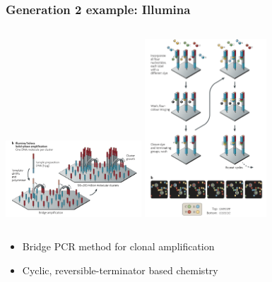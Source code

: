 \documentclass[serif,11pt]{beamer}
\begin{document}
\begin{frame}
\frametitle{Generation 2 example: Illumina}
\label{sec-2-3}

   \begin{columns}[c]
   \column{2.2in} \hspace{0.1in} \includegraphics[width=2in]{img/illumina-amplification.png}
   \column{2.5in} \includegraphics[width=1.8in]{img/illumina-reaction.png}
   \end{columns}

\begin{itemize}
\item Bridge PCR method for clonal amplification
\item Cyclic, reversible-terminator based chemistry
\end{itemize}
\end{frame}
\end{document}
